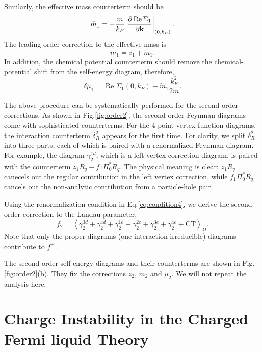 \documentclass[reprint,amsmath,amssymb,aps,prb]{revtex4-1}
\begin{document}
Similarly, the effective mass counterterm should be
\begin{equation}
    \tilde{m}_1 = -\frac{m}{k_F}\left. \frac{\partial \operatorname{Re} \Sigma_1}{\partial \bold{k}} \right|_{(0, k_F)}.
\end{equation}
The leading order correction to the effective mass is
\begin{equation}
    m_1 = z_1+\tilde{m}_1.
\end{equation}
In addition, the chemical potential counterterm should remove the chemical-potential shift from the self-energy diagram, therefore,
\begin{equation}
    \delta \mu_1 = \operatorname{Re} \Sigma_1(0, k_F)+\tilde{m}_1\frac{k_F^2}{2m}.
\end{equation}

The above procedure can be systematically performed for the second order corrections.
As shown in Fig.\ref{fig:order2}, the second order Feynman diagrams come with sophisticated counterterms.
For the $4$-point vertex function diagrams, the interaction counterterm $\delta_R^2$ appears for the first time.
For clarity, we split $\delta_R^2$ into three parts, each of which is paired with a renormalized Feynman diagram.
For example, the diagram $\gamma_2^{1d}$, which is a left vertex correction diagram, is paired with the counterterm $z_1R_q-f1\Pi^*_0R_q$.
The physical meaning is clear: $z_1 R_q$ canecels out the regular contribution in the left vertex correction,
while $f_1\Pi_0^*R_q$ cancels out the non-analytic contribution from a particle-hole pair.

Using the renormalization condition in Eq.\eqref{eq:condition4}, we derive the second-order correction to the Landau parameter,
\begin{equation}
    f_2 = \left<\gamma_2^{3d}+\gamma_2^{4d}+\gamma_2^{1e}+\gamma_2^{2e}+\gamma_2^{3e}+\gamma_2^{4e} + \text{CT}\right>_\Omega.
\end{equation}
Note that only the proper diagrams (one-interaction-irreducible) diagrams contribute to $f^+$.

The second-order self-energy diagrams and their counterterms are shown in Fig.\ref{fig:order2}(b).
They fix the corrections $z_2$, $m_2$ and $\mu_2$. We will not repeat the analysis here.

\section{Charge Instability in the Charged Fermi liquid Theory}
\end{document}
